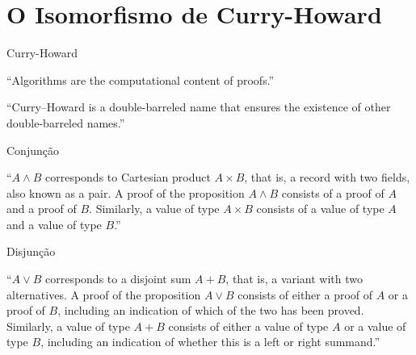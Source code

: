 \documentclass{beamer}
\begin{document}
\section{O Isomorfismo de Curry-Howard}

\begin{frame}{Curry-Howard}

\begin{exampleblock}{}
\justifying
  {\large ``Algorithms are the computational content of proofs.''}
  \vskip5mm
  \hspace*{}
\end{exampleblock}

\begin{exampleblock}{}
\justifying
  {\large ``Curry–Howard is a double-barreled name that ensures the existence of other double-barreled names.''}
  \vskip5mm
  \hspace*{}
\end{exampleblock}

\end{frame}


\begin{frame}{Conjunção}

“$A \land B$ corresponds to Cartesian product $A \times B$,
that is, a record with two fields, also known as a
pair. A proof of the proposition $A \land B$ consists of a
proof of $A$ and a proof of $B$. Similarly, a value of
type $A \times B$ consists of a value of type $A$ and a
value of type $B$.”

\end{frame}


\begin{frame}{Disjunção}

“$A \lor B$ corresponds to a disjoint sum $A + B$, that
is, a variant with two alternatives. A proof of the
proposition $A \lor B$ consists of either a proof of $A$
or a proof of $B$, including an indication of which
of the two has been proved. Similarly, a value of
type $A + B$ consists of either a value of type $A$ or
a value of type $B$, including an indication of
whether this is a left or right summand.”

\end{frame}

\end{document}
